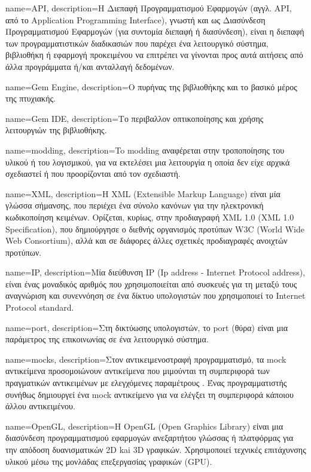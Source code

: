 {
	name=API,
	description={H Διεπαφή Προγραμματισμού Εφαρμογών (αγγλ. API, από το Application Programming Interface), γνωστή και ως Διασύνδεση Προγραμματισμού Εφαρμογών (για συντομία διεπαφή ή διασύνδεση), είναι η διεπαφή των προγραμματιστικών διαδικασιών που παρέχει ένα λειτουργικό σύστημα, βιβλιοθήκη ή εφαρμογή προκειμένου να επιτρέπει να γίνονται προς αυτά αιτήσεις από άλλα προγράμματα ή/και ανταλλαγή δεδομένων.}
}

{
	name=Gem Engine,
	description={Ο πυρήνας της βιβλιοθήκης και το βασικό μέρος της πτυχιακής.}
}

{
	name=Gem IDE,
	description={Το περιβαλλον οπτικοποίησης και χρήσης λειτουργιών της βιβλιοθήκης.}
}

{
	name=modding,
	description={To modding αναφέρεται στην τροποποίησης του υλικού ή του λογισμικού, για να εκτελέσει μια λειτουργία η οποία δεν είχε αρχικά σχεδιαστεί ή που προορίζονται από τον σχεδιαστή.}
}

{
	name=XML,
	description={H XML (Extensible Markup Language) είναι μία γλώσσα σήμανσης, που περιέχει ένα σύνολο κανόνων για την ηλεκτρονική κωδικοποίηση κειμένων. Ορίζεται, κυρίως, στην προδιαγραφή XML 1.0 (XML 1.0 Specification), που δημιούργησε ο διεθνής οργανισμός προτύπων W3C (World Wide Web Consortium), αλλά και σε διάφορες άλλες σχετικές προδιαγραφές ανοιχτών προτύπων.}
}

{
	name=IP,
	description={Μία διεύθυνση IP (Ip address - Internet Protocol address), είναι ένας μοναδικός αριθμός που χρησιμοποιείται από συσκευές για τη μεταξύ τους αναγνώριση και συνεννόηση σε ένα δίκτυο υπολογιστών που χρησιμοποιεί το Internet Protocol standard. }
}

{
	name=port,
	description={Στη δικτύωσης υπολογιστών, το port (θύρα) είναι μια παράμετρος της επικοινωνίας σε ένα λειτουργικό σύστημα.}
}

{
	name=mocks,
	description={Στον αντικειμενοστραφή προγραμματισμό, τα mock αντικείμενα προσομοιώνουν αντικείμενα που μιμούνται τη συμπεριφορά των πραγματικών αντικειμένων με ελεγχόμενες παραμέτρους . Ένας προγραμματιστής συνήθως δημιουργεί ένα mock αντικείμενο για να ελέγξει τη συμπεριφορά κάποιου άλλου αντικειμένου.}
}

{
	name=OpenGL,
	description={H OpenGL (Open Graphics Library) είναι μια διασύνδεση προγραμματισμού εφαρμογών ανεξαρτήτου γλώσσας ή πλατφόρμας για την απόδοση δυανισματικών 2D kai 3D γραφικών. Χρησιμοποιεί τεχνικές επιτάχυνσης υλικού μέσω της μονλάδας επεξεργασίας γραφικών (GPU).}
}

